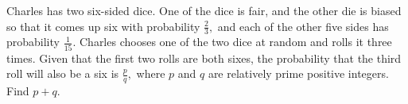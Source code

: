 Charles has two six-sided dice. One of the dice is fair, and the other die is biased so that it comes up six with probability $\tfrac23,$ and each of the other five sides has probability $\tfrac{1}{15}.$ Charles chooses one of the two dice at random and rolls it three times. Given that the first two rolls are both sixes, the probability that the third roll will also be a six is $\tfrac{p}{q},$ where $p$ and $q$ are relatively prime positive integers. Find $p+q$.